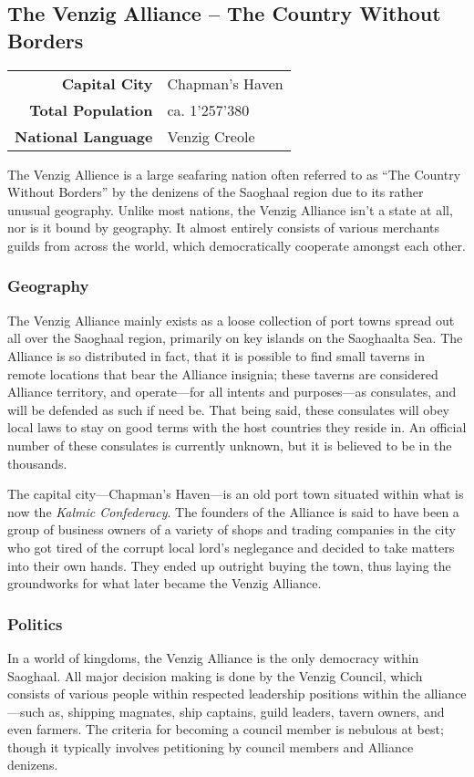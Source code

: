 \subsection{The Venzig Alliance -- The Country Without Borders}
\begin{tabular}{r | l}
    \textbf{Capital City} & Chapman's Haven\\
    \textbf{Total Population} & ca. 1'257'380\\
    \textbf{National Language} & Venzig Creole
\end{tabular}

The Venzig Allience is a large seafaring nation often referred to as ``The Country Without Borders'' by the denizens of the Saoghaal region due to its rather unusual geography.
Unlike most nations, the Venzig Alliance isn't a state at all, nor is it bound by geography.
It almost entirely consists of various merchants guilds from across the world, which democratically cooperate amongst each other.

\subsubsection{Geography}
The Venzig Alliance mainly exists as a loose collection of port towns spread out all over the Saoghaal region, primarily on key islands on the Saoghaalta Sea.
The Alliance is so distributed in fact, that it is possible to find small taverns in remote locations that bear the Alliance insignia; these taverns are considered Alliance territory, and operate---for all intents and purposes---as consulates, and will be defended as such if need be.
That being said, these consulates will obey local laws to stay on good terms with the host countries they reside in.
An official number of these consulates is currently unknown, but it is believed to be in the thousands.

The capital city---Chapman's Haven---is an old port town situated within what is now the \textit{Kalmic Confederacy}.
The founders of the Alliance is said to have been a group of business owners of a variety of shops and trading companies in the city who got tired of the corrupt local lord's neglegance and decided to take matters into their own hands.
They ended up outright buying the town, thus laying the groundworks for what later became the Venzig Alliance.

\subsubsection{Politics}
In a world of kingdoms, the Venzig Alliance is the only democracy within Saoghaal.
All major decision making is done by the Venzig Council, which consists of various people within respected leadership positions within the alliance---such as, shipping magnates, ship captains, guild leaders, tavern owners, and even farmers.
The criteria for becoming a council member is nebulous at best; though it typically involves petitioning by council members and Alliance denizens.

